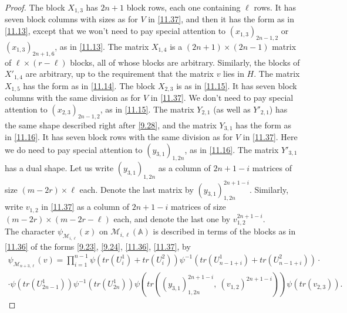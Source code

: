 \documentclass[12pts]{amsart}
\newcommand{\BA}{{\mathbb {A}}}
\begin{document}
\begin{proof}
The block $X_{1,3}$ has $2n+1$ block rows, each one containing $\ell$ rows. It has seven block columns with sizes as for $V$ in \eqref{11.37}, and then it has the form as in \eqref{11.13}, except that we won't need to pay special attention to $(x_{1,3})_{2n-1,2}$ or $(x_{1,3})_{2n+1,6}$, as in \eqref{11.13}. The matrix $X_{1,4}$ is a $(2n+1)\times (2n-1)$ matrix of $\ell\times (r-\ell)$ blocks, all of whose blocks are arbitrary.  Similarly, the blocks of $X'_{1,4}$ are arbitrary, up to the requirement that the matrix $v$ lies in $H$. The matrix $X_{1,5}$ has the form
as in \eqref{11.14}. The block $X_{2,3}$ is as in \eqref{11.15}. It has seven block columns with the same division as for $V$ in \eqref{11.37}. We don't need to pay special attention to $(x_{2,3})_{2n-1,2}$, as in \eqref{11.15}.
The matrix $Y_{2,1}$ (as well as $Y'_{2,1}$) has the same shape described right after \eqref{9.28}, and the matrix $Y_{3,1}$ has the form
as in \eqref{11.16}. It has seven block rows with the same division as for $V$ in \eqref{11.37}. Here we do need to pay special attention to $(y_{3,1})_{1,2n}$, as in \eqref{11.16}. The matrix $Y'_{3,1}$ has a dual shape. Let us write $(y_{3,1})_{1,2n}$ as a column of $2n+1-i$ matrices of size $(m-2r)\times \ell$ each. Denote the last matrix by $(y_{3,1})_{1,2n}^{2n+1-i}$. Similarly, write $v_{1,2}$ in \eqref{11.37} as a column of $2n+1-i$ matrices of size $(m-2r)\times (m-2r-\ell)$ each, and denote the last one by $v_{1,2}^{2n+1-i}$.\\
The character $\psi_{\mathcal{M}_{i,\ell}}(x)$ on $\mathcal{M}_{i,\ell}(\BA)$ is described in terms of the blocks as in \eqref{11.36} of the forms \eqref{9.23}, \eqref{9.24}, \eqref{11.36}, \eqref{11.37}, by 
\begin{multline}\label{11.38}
 \psi_{\mathcal{M}_{n+3,\ell}}(v)=\prod_{i=1}^{n-1}\psi(tr(U^1_i)+tr(U^2_i))\psi^{-1}(tr(U^1_{n-1+i})+tr(U^2_{n-1+i}))\cdot \\
 \cdot\psi(tr(U^1_{2n-1}))\psi^{-1}(tr(U^1_{2n}))\psi(tr((y_{3,1})_{1,2n}^{2n+1-i},\ (v_{1,2})^{2n+1-i}))\psi(tr(v_{2,3})).
  \end{multline}


\end{proof}
\end{document}
